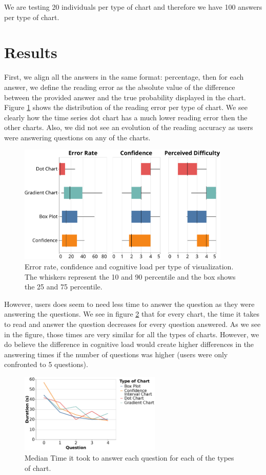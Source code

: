 \documentclass[a4paper,3p,sort&compress]{elsarticle}
\begin{document}
We are testing 20 individuals per type of chart and therefore we have 100 answers per 
type of chart.

\section{Results}
\label{sec:results}

First, we align all the answers in the same format: percentage, then for each answer, we define the 
reading error as the absolute value of the difference 
between the provided answer and the true probability displayed in the chart. Figure \ref{figure:errors} shows 
the distribution of the reading error per type of chart. We see clearly how the time series dot chart
has a much lower reading error then the other charts. Also, we did not see an evolution of the reading accuracy as 
users were answering questions on any of the charts.

\begin{figure}
  \centering
  \includegraphics[width=0.9\textwidth]{comparison}
  \caption{\label{figure:errors}Error rate, confidence and cognitive load per type of visualization. The whiskers represent the 10 and 90 percentile and the box shows the 25 and 75 percentile.}
\end{figure}

However, users does seem to need less time to answer the question as they were answering the questions. 
We see in figure \ref{figure:duration} that for every chart, the time it takes 
to read and answer the question decreases for every question answered. As we see in the figure, those times 
are very similar for all the types of charts. However, we do believe the difference in cognitive load would 
create higher differences in the answering times if the number of questions was higher (users were only confronted
to 5 questions).

\begin{figure}
  \centering
   \includegraphics[width=0.6\textwidth]{duration_evo2}
  \caption{\label{figure:duration} Median Time it took to answer each question for each of the types of chart.}
\end{figure}  
\end{document}
